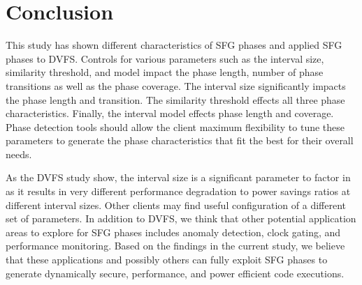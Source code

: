 \section{Conclusion}

This study has shown different characteristics of SFG phases and applied SFG phases to DVFS. Controls for various parameters such as the interval size, similarity threshold, and model impact the phase length, number of phase transitions as well as the phase coverage. The interval size significantly impacts the phase length and transition. The similarity threshold effects all three phase characteristics. Finally, the interval model effects phase length and coverage. Phase detection tools should allow the client maximum flexibility to tune these parameters to generate the phase characteristics that fit the best for their overall needs. 

As the DVFS study show, the interval size is a significant parameter to factor in as it results in very different performance degradation to power savings ratios at different interval sizes. Other clients may find useful configuration of a different set of parameters. In addition to DVFS, we think that other potential application areas to explore for SFG phases includes anomaly detection, clock gating, and performance monitoring. Based on the findings in the current study, we believe that these applications and possibly others can fully exploit SFG phases to generate dynamically secure, performance, and power efficient code executions.
